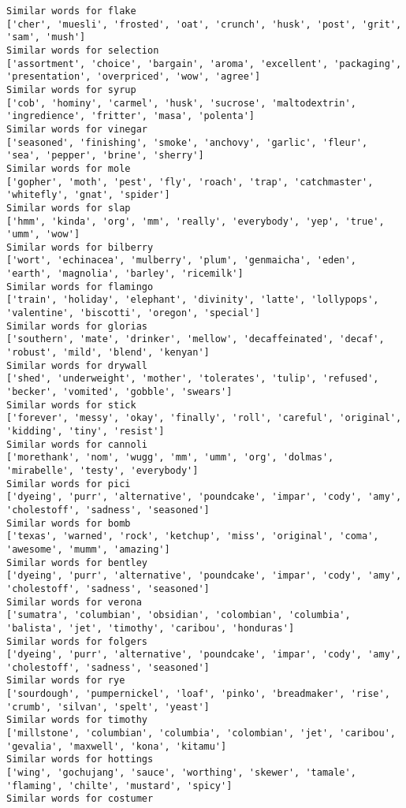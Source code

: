 \documentclass[11pt]{article}
\begin{document}
\begin{Verbatim}[commandchars=\\\{\}]
Similar words for flake
['cher', 'muesli', 'frosted', 'oat', 'crunch', 'husk', 'post', 'grit', 'sam', 'mush']
Similar words for selection
['assortment', 'choice', 'bargain', 'aroma', 'excellent', 'packaging', 'presentation', 'overpriced', 'wow', 'agree']
Similar words for syrup
['cob', 'hominy', 'carmel', 'husk', 'sucrose', 'maltodextrin', 'ingredience', 'fritter', 'masa', 'polenta']
Similar words for vinegar
['seasoned', 'finishing', 'smoke', 'anchovy', 'garlic', 'fleur', 'sea', 'pepper', 'brine', 'sherry']
Similar words for mole
['gopher', 'moth', 'pest', 'fly', 'roach', 'trap', 'catchmaster', 'whitefly', 'gnat', 'spider']
Similar words for slap
['hmm', 'kinda', 'org', 'mm', 'really', 'everybody', 'yep', 'true', 'umm', 'wow']
Similar words for bilberry
['wort', 'echinacea', 'mulberry', 'plum', 'genmaicha', 'eden', 'earth', 'magnolia', 'barley', 'ricemilk']
Similar words for flamingo
['train', 'holiday', 'elephant', 'divinity', 'latte', 'lollypops', 'valentine', 'biscotti', 'oregon', 'special']
Similar words for glorias
['southern', 'mate', 'drinker', 'mellow', 'decaffeinated', 'decaf', 'robust', 'mild', 'blend', 'kenyan']
Similar words for drywall
['shed', 'underweight', 'mother', 'tolerates', 'tulip', 'refused', 'becker', 'vomited', 'gobble', 'swears']
Similar words for stick
['forever', 'messy', 'okay', 'finally', 'roll', 'careful', 'original', 'kidding', 'tiny', 'resist']
Similar words for cannoli
['morethank', 'nom', 'wugg', 'mm', 'umm', 'org', 'dolmas', 'mirabelle', 'testy', 'everybody']
Similar words for pici
['dyeing', 'purr', 'alternative', 'poundcake', 'impar', 'cody', 'amy', 'cholestoff', 'sadness', 'seasoned']
Similar words for bomb
['texas', 'warned', 'rock', 'ketchup', 'miss', 'original', 'coma', 'awesome', 'mumm', 'amazing']
Similar words for bentley
['dyeing', 'purr', 'alternative', 'poundcake', 'impar', 'cody', 'amy', 'cholestoff', 'sadness', 'seasoned']
Similar words for verona
['sumatra', 'columbian', 'obsidian', 'colombian', 'columbia', 'balista', 'jet', 'timothy', 'caribou', 'honduras']
Similar words for folgers
['dyeing', 'purr', 'alternative', 'poundcake', 'impar', 'cody', 'amy', 'cholestoff', 'sadness', 'seasoned']
Similar words for rye
['sourdough', 'pumpernickel', 'loaf', 'pinko', 'breadmaker', 'rise', 'crumb', 'silvan', 'spelt', 'yeast']
Similar words for timothy
['millstone', 'columbian', 'columbia', 'colombian', 'jet', 'caribou', 'gevalia', 'maxwell', 'kona', 'kitamu']
Similar words for hottings
['wing', 'gochujang', 'sauce', 'worthing', 'skewer', 'tamale', 'flaming', 'chilte', 'mustard', 'spicy']
Similar words for costumer

\end{Verbatim}
\end{document}
